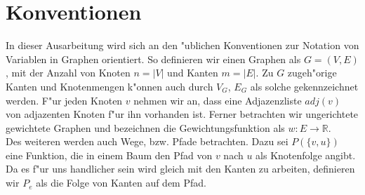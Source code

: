 \section{Konventionen}
In dieser Ausarbeitung wird sich an den "ublichen Konventionen zur Notation
    von Variablen in Graphen orientiert. So definieren wir einen Graphen als
    $G = (V,E)$, mit der Anzahl von Knoten $n = |V|$ und Kanten $m = |E|$.
    Zu $G$ zugeh"orige Kanten und Knotenmengen k"onnen auch durch $V_G$, $E_G$
    als solche gekennzeichnet werden.
    F"ur jeden Knoten $v$ nehmen wir an, dass eine Adjazenzliste $adj(v)$ von
    adjazenten Knoten f"ur ihn vorhanden ist.
    Ferner betrachten wir ungerichtete gewichtete Graphen und bezeichnen 
    die Gewichtungsfunktion als $w: E \rightarrow \mathbb{R}$.\\
Des weiteren werden auch Wege, bzw. Pfade betrachten. 
    Dazu sei $P(\{v,u\})$ eine Funktion, die in einem Baum den Pfad 
    von $v$ nach $u$ als Knotenfolge angibt.
    Da es f"ur uns handlicher sein wird
    gleich mit den Kanten zu arbeiten, definieren wir $P_e$ als die Folge von
    Kanten auf dem Pfad.\\
